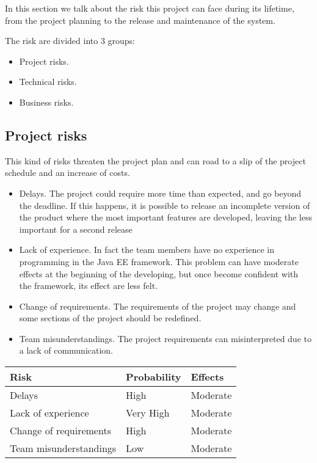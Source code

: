 In this section we talk about the risk this project can face during its lifetime, from the project planning to the release and maintenance of the system.

The risk are divided into 3 groups: 
\begin{itemize}
    \item Project risks.
    \item Technical risks.
    \item Business risks.
\end{itemize}

\subsection{Project risks}
This kind of risks threaten the project plan and can road to a slip of the project schedule and an increase of costs.

\begin{itemize}
    \item Delays. The project could require more time than expected, and go beyond the deadline. If this happens, it is possible to release an incomplete version of the product where the most important features are developed, leaving the less important for a second release
    \item Lack of experience. In fact the team members have no experience in programming in the Java EE framework. This problem can have moderate effects at the beginning of the developing, but once become confident with the framework, its effect are less felt.
    \item Change of requirements. The requirements of the project may change and some sections of the project should be redefined.
    \item Team misunderstandings. The project requirements can misinterpreted due to a lack of communication. 
\end{itemize}

\begin{table}[h]
\centering
    \begin{tabular}{|l|l|l|}
        \hline
        Risk & Probability & Effects \\
        \hline
        Delays & High & Moderate \\
        \hline
        Lack of experience & Very High & Moderate \\
        \hline
        Change of requirements & High & Moderate \\
        \hline
        Team misunderstandings & Low & Moderate \\
        \hline
    \end{tabular}
\end{table}


